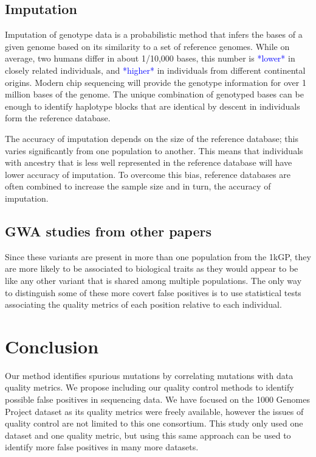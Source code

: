 \documentclass[9pt,lineno]{elife}
\newcommand{\luke}[1]{\textcolor{blue}{Luke: #1}}
\newcommand{\todo}[1]{\textcolor{blue}{*#1*}}
\begin{document}


\subsection{Imputation}
Imputation of genotype data is a probabilistic method that infers the bases of a given genome based on its similarity to a set of reference genomes.
While on average, two humans differ in about 1/10,000 bases, this number is \todo{lower} in closely related individuals, and \todo{higher} in individuals from different continental origins.
Modern chip sequencing will provide the genotype information for over 1 million bases of the genome.
The unique combination of genotyped bases can be enough to identify haplotype blocks that are identical by descent in individuals form the reference database.


The accuracy of imputation depends on the size of the reference database; this varies significantly from one population to another.
This means that individuals with ancestry that is less well represented in the reference database will have lower accuracy of imputation.
To overcome this bias, reference databases are often combined to increase the sample size and in turn, the accuracy of imputation.

\subsection{GWA studies from other papers}
Since these variants are present in more than one population from the 1kGP, they are more likely to be associated to biological traits as they would appear to be like any other variant that is shared among multiple populations. 
The only way to distinguish some of these more covert false positives is to use statistical tests associating the quality metrics of each position relative to each individual. 


			\section{Conclusion}
Our method identifies spurious mutations by correlating mutations with data quality metrics. 
We propose including our quality control methods to identify possible false positives in sequencing data. 
We have focused on the 1000 Genomes Project dataset as its quality metrics were freely available, however the issues of quality control are not limited to this one consortium. 
This study only used one dataset and one quality metric, but using this same approach can be used to identify more false positives in many more datasets. 
\end{document}

